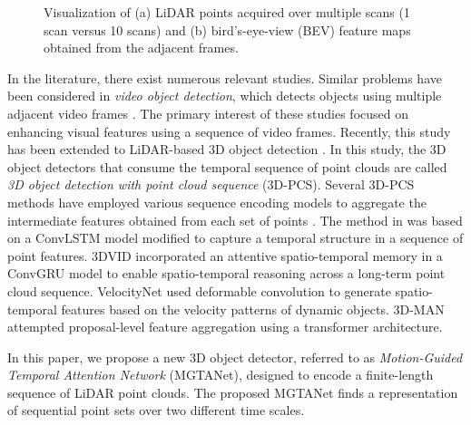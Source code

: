 \documentclass[letterpaper]{article} \usepackage{aaai23}  \usepackage{times}  \usepackage{helvet}  \usepackage{courier}  \usepackage[hyphens]{url}  \usepackage{graphicx} \urlstyle{rm} \def\UrlFont{\rm}  \usepackage{natbib}  \usepackage{caption} \frenchspacing  \setlength{\pdfpagewidth}{8.5in} \usepackage{algorithm}
\begin{document}
\begin{figure}[t]
    \centering
    \begin{subfigure}[]
    {
        \label{sm_vfe_motivation}
        \texttt{[image: figure/sa\_vfe\_motivation.pdf]}
    }
    \end{subfigure}
    \vspace{5mm}
    \begin{subfigure}[]
    {
        \label{mg_fam_motivation}
        \texttt{[image: figure/mgda\_motivation.pdf]}
    }
    \end{subfigure}
    \hspace{5mm}
    \caption { Visualization of (a) LiDAR points acquired over multiple scans (1 scan versus 10 scans) and (b) bird's-eye-view (BEV) feature maps obtained from the adjacent frames. 
    }
    \label{motivation}
\end{figure}

In the literature, there exist numerous relevant studies. Similar problems have been considered in {\it video object detection}, which detects objects using multiple adjacent video frames  \cite{D&T,fgfa,manet,rdn,selsa,psla,vod-mt,mega,tm-vod}. The primary interest of these studies focused on enhancing visual features using a sequence of video frames. Recently, this study has been extended to LiDAR-based 3D object detection \cite{3dvodlstm,3dvid,tctr,velocitynet,3dman}. In this study, the 3D object detectors that consume the temporal sequence of point clouds are called {\it 3D object detection with point cloud sequence} (3D-PCS). 
Several 3D-PCS methods have employed various sequence encoding models to aggregate the intermediate features obtained from each set of points \cite{3dvodlstm,3dvid,tctr,velocitynet,3dman}. The method in \cite{3dvodlstm} was based on a ConvLSTM model \cite{convlstm}  modified to capture a temporal structure in a sequence of point features. 3DVID \cite{3dvid} incorporated an attentive spatio-temporal memory in a ConvGRU model \cite{ConvGRU}  to enable spatio-temporal reasoning across a long-term point cloud sequence. VelocityNet \cite{velocitynet} used deformable convolution to generate  spatio-temporal features based on the velocity patterns of dynamic objects. 
3D-MAN \cite{3dman} attempted proposal-level feature aggregation using a transformer architecture.

In this paper, we propose a new 3D object detector, referred to as {\it Motion-Guided Temporal Attention Network} (MGTANet), designed to encode a finite-length sequence of LiDAR point clouds. The proposed MGTANet finds a representation of sequential point sets over two different time scales.
\end{document}
